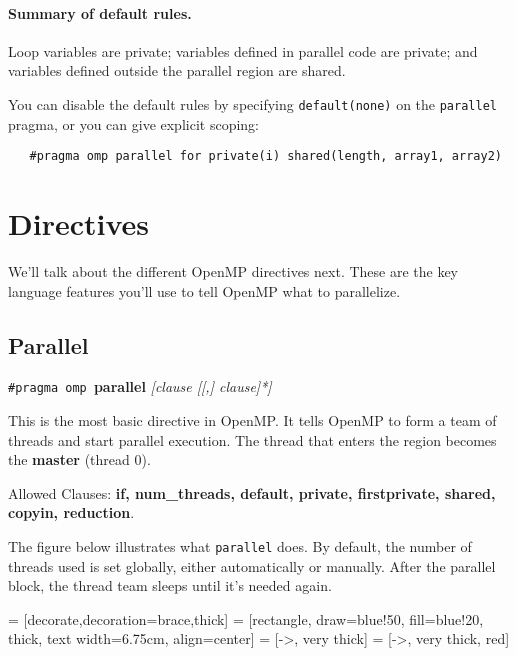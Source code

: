 \paragraph{Summary of default rules.} Loop variables are private; 
variables defined in parallel code are private; and variables defined
outside the parallel region are shared.

You can disable the default rules by specifying {\tt default(none)}
on the {\tt parallel} pragma, or you can give explicit scoping:

\verb+   #pragma omp parallel for private(i) shared(length, array1, array2)+

\section*{Directives}
We'll talk about the different OpenMP directives next. These are the key
language features you'll use to tell OpenMP what to parallelize.

\subsection*{Parallel}
  \begin{center}
    {\tt \#pragma omp }{\bf parallel} {\it [clause [[,] clause]*]}
  \end{center}

This is the most basic directive in OpenMP.
It tells OpenMP to form a team of threads and start parallel execution.
The thread that enters the region becomes the {\bf master} (thread 0).

Allowed Clauses: {\bf if, num\_threads, default, private, firstprivate,
    shared, copyin, reduction}.

The figure below illustrates what {\tt parallel} does.
By default, the number of threads used is set globally, either automatically
or manually. After the parallel block, the thread team sleeps until it's needed again.

   = [decorate,decoration={brace},thick]
   = [rectangle, draw=blue!50, fill=blue!20, thick,
                            text width=6.75cm, align=center]
   = [->, very thick]
   = [->, very thick, red]


